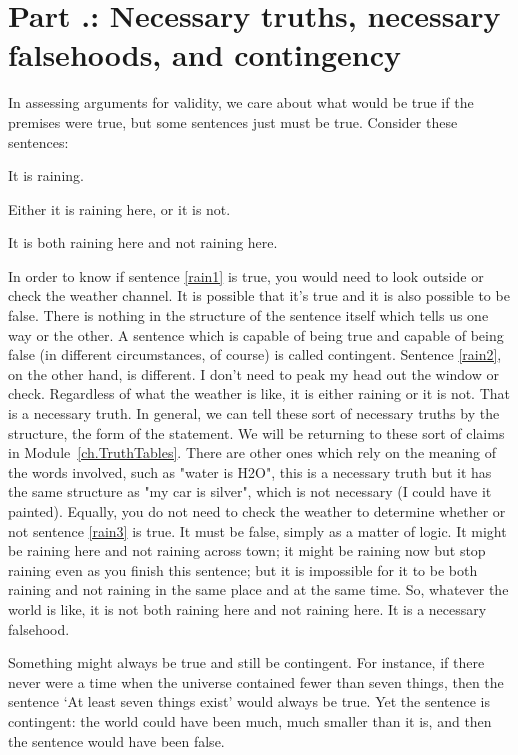 \section{Part \thechapcount.\theseccount: Necessary truths, necessary falsehoods, and contingency}\label{s.nectruth}
In assessing arguments for validity, we care about what would be true if the premises were true, but some sentences just must be true. Consider these sentences:
\begin{earg}
\item[\ex{rain1}] It is raining.
\item[\ex{rain2}] Either it is raining here, or it is not.
\item[\ex{rain3}] It is both raining here and not raining here.
\end{earg}
In order to know if sentence \ref{rain1} is true, you would need to look outside or check the weather channel. It is possible that it's true and it is also possible to be false. There is nothing in the structure of the sentence itself which tells us one way or the other. A sentence which is capable of being true and capable of being false (in different circumstances, of course) is called contingent. Sentence \ref{rain2}, on the other hand, is different. I don't need to peak my head out the window or check.  Regardless of what the weather is like, it is either raining or it is not. That is a necessary truth. In general, we can tell these sort of necessary truths by the structure, the form of the statement. We will be returning to these sort of claims in Module~\ref{ch.TruthTables}. There are other ones which rely on the meaning of the words involved, such as "water is H2O", this is a necessary truth but it has the same structure as "my car is silver", which is not necessary (I could have it painted). Equally, you do not need to check the weather to determine whether or not sentence \ref{rain3} is true. It must be false, simply as a matter of logic. It might be raining here and not raining across town; it might be raining now but stop raining even as you finish this sentence; but it is impossible for it to be both raining and not raining in the same place and at the same time. So, whatever the world is like, it is not both raining here and not raining here. It is a necessary falsehood.

Something might always be true and still be contingent. For instance, if there never were a time when the universe contained fewer than seven things, then the sentence ‘At least seven things exist’ would always be true. Yet the sentence is contingent: the world could have been much, much smaller than it is, and then the sentence would have been false.
